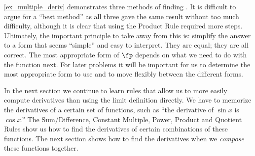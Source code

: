 \autoref{ex_multiple_deriv} demonstrates three methods of finding \fp. It is difficult to argue for a ``best method'' as all three gave the same result without too much difficulty, although it is clear that using the Product Rule required more steps. Ultimately, the important principle to take away from this is: simplify the answer to a form that seems ``simple'' and easy to interpret.  They are equal; they are all correct. The most appropriate form of $\fp$ depends on what we need to do with the function next. For later problems it will be important for us to determine the most appropriate form to use and to move flexibly between the different forms.
		
In the next section we continue to learn rules that allow us to more easily compute derivatives than using the limit definition directly. We have to memorize the derivatives of a certain set of functions, such as ``the derivative of $\sin x$ is $\cos x$.'' The Sum/Difference, Constant Multiple, Power, Product and Quotient Rules show us how to find the derivatives of certain combinations of these functions. The next section shows how to find the derivatives when we \emph{compose} these functions together.

